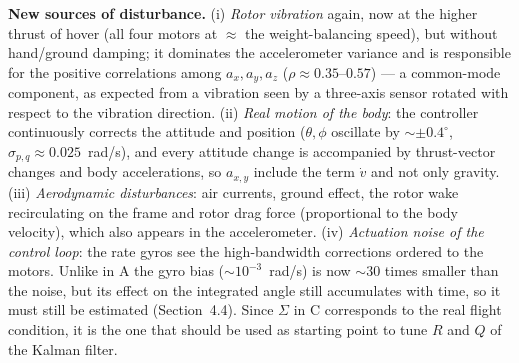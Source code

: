 \textbf{New sources of disturbance.} (i) \emph{Rotor vibration} again, now at the higher thrust of hover (all four motors at $\approx$ the weight-balancing speed), but
without hand/ground damping; it dominates the accelerometer variance and is responsible for the positive correlations among $a_x,a_y,a_z$
($\rho\approx0.35$--$0.57$) --- a common-mode component, as expected from a vibration seen by a three-axis sensor rotated with respect to the
vibration direction. (ii) \emph{Real motion of the body}: the controller continuously corrects the attitude and position ($\theta,\phi$ oscillate by $\sim\pm0.4^\circ$, $\sigma_{p,q}\approx0.025$~rad/s),
and every attitude change is accompanied by thrust-vector changes and body accelerations, so $a_{x,y}$ include the term $\dot v$ and not only gravity. (iii) \emph{Aerodynamic disturbances}:
air currents, ground effect, the rotor wake recirculating on the frame and rotor drag force (proportional to the body velocity), which also appears in the accelerometer. (iv) \emph{Actuation noise of the control loop}:
the rate gyros see the high-bandwidth corrections ordered to the motors. Unlike in A the gyro bias ($\sim10^{-3}$~rad/s) is now $\sim30$ times smaller than the noise, but its effect on the integrated angle
still accumulates with time, so it must still be estimated (Section~4.4). Since $\Sigma$ in C corresponds to the real flight condition, it is the one that should be used as starting point
to tune $R$ and $Q$ of the Kalman filter.
